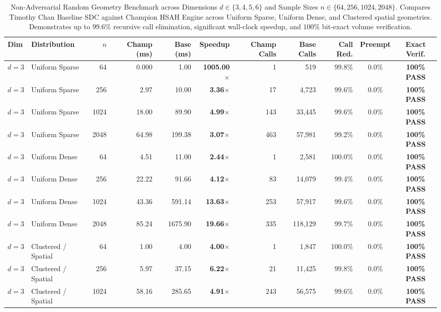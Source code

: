 \begin{table}[t]
\centering
\caption{Non-Adversarial Random Geometry Benchmark across Dimensions $d \in \{3, 4, 5, 6\}$ and Sample Sizes $n \in \{64, 256, 1024, 2048\}$. Compares Timothy Chan Baseline SDC against Champion HSAH Engine across Uniform Sparse, Uniform Dense, and Clustered spatial geometries. Demonstrates up to $99.6\%$ recursive call elimination, significant wall-clock speedup, and $100\%$ bit-exact volume verification.}
\label{tab:random_geometry}
\small
\begin{tabular}{llr rrrrr rcc}
\toprule
\textbf{Dim} & \textbf{Distribution} & $n$ & \textbf{Champ (ms)} & \textbf{Base (ms)} & \textbf{Speedup} & \textbf{Champ Calls} & \textbf{Base Calls} & \textbf{Call Red.} & \textbf{Preempt} & \textbf{Exact Verif.} \\
\midrule
$d = 3$ & Uniform Sparse & 64 & 0.000 & 1.00 & \textbf{1005.00$\times$} & 1 & 519 & 99.8\% & 0.0\% & \textbf{100\% PASS} \\
$d = 3$ & Uniform Sparse & 256 & 2.97 & 10.00 & \textbf{3.36$\times$} & 17 & 4,723 & 99.6\% & 0.0\% & \textbf{100\% PASS} \\
$d = 3$ & Uniform Sparse & 1024 & 18.00 & 89.90 & \textbf{4.99$\times$} & 143 & 33,445 & 99.6\% & 0.0\% & \textbf{100\% PASS} \\
$d = 3$ & Uniform Sparse & 2048 & 64.98 & 199.38 & \textbf{3.07$\times$} & 463 & 57,981 & 99.2\% & 0.0\% & \textbf{100\% PASS} \\
$d = 3$ & Uniform Dense & 64 & 4.51 & 11.00 & \textbf{2.44$\times$} & 1 & 2,581 & 100.0\% & 0.0\% & \textbf{100\% PASS} \\
$d = 3$ & Uniform Dense & 256 & 22.22 & 91.66 & \textbf{4.12$\times$} & 83 & 14,079 & 99.4\% & 0.0\% & \textbf{100\% PASS} \\
$d = 3$ & Uniform Dense & 1024 & 43.36 & 591.14 & \textbf{13.63$\times$} & 253 & 57,917 & 99.6\% & 0.0\% & \textbf{100\% PASS} \\
$d = 3$ & Uniform Dense & 2048 & 85.24 & 1675.90 & \textbf{19.66$\times$} & 335 & 118,129 & 99.7\% & 0.0\% & \textbf{100\% PASS} \\
$d = 3$ & Clustered / Spatial & 64 & 1.00 & 4.00 & \textbf{4.00$\times$} & 1 & 1,847 & 100.0\% & 0.0\% & \textbf{100\% PASS} \\
$d = 3$ & Clustered / Spatial & 256 & 5.97 & 37.15 & \textbf{6.22$\times$} & 21 & 11,425 & 99.8\% & 0.0\% & \textbf{100\% PASS} \\
$d = 3$ & Clustered / Spatial & 1024 & 58.16 & 285.65 & \textbf{4.91$\times$} & 243 & 56,575 & 99.6\% & 0.0\% & \textbf{100\% PASS} \\

\end{tabular}
\end{table}

